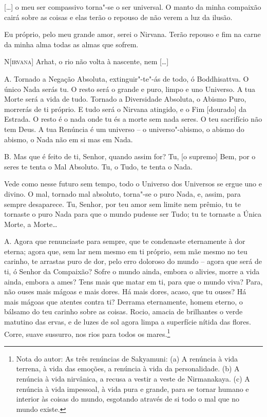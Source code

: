 [\ldots{}] o meu ser compassivo torna"-se o ser universal. O manto da minha
compaixão cairá sobre as coisas e elas terão o repouso de não verem a
luz da ilusão.

Eu próprio, pelo meu grande amor, serei o Nirvana. Terão repouso e fim
na carne da minha alma todas as almas que sofrem.

\textsc{N[irvana]} Arhat, o rio não volta à nascente, nem [\ldots{}]

\textsc{A.} Tornado a Negação Absoluta, extinguir"-te"-ás de todo, ó
Boddhisattva. O único Nada serás tu. O resto será o grande e puro,
limpo e uno Universo. A tua Morte será a vida de tudo. Tornado a
Diversidade Absoluta, o Abismo Puro, morrerás de ti próprio. E tudo
será o Nirvana atingido, e o Fim [dourado] da Estrada. O resto é o
nada onde tu és a morte sem nada seres. O teu sacrifício não tem
Deus. A tua Renúncia é um universo -- o universo"-abismo, o abismo do
abismo, o Nada não em si mas em Nada.

\textsc{B.} Mas que é feito de ti, Senhor, quando assim for? Tu, [o supremo]
Bem, por o seres te tenta o Mal Absoluto. Tu, o Tudo, te tenta o
Nada.

Vede como nesse futuro sem tempo, todo o Universo dos Universos se
ergue uno e divino. O mal, tornado mal absoluto, torna"-se o puro
Nada, e, assim, para sempre desaparece. Tu, Senhor, por teu amor sem
limite nem prêmio, tu te tornaste o puro Nada para que o mundo
pudesse ser Tudo; tu te tornaste a Única Morte, a Morte\ldots{}

\textsc{A.} Agora que renunciaste para sempre, que te condenaste eternamente à
dor eterna; agora que, sem lar nem mesmo em ti próprio, sem mãe mesmo
no teu carinho, te arrastas puro de dor, pelo erro doloroso do mundo
-- agora que será de ti, ó Senhor da Compaixão? Sofre o mundo ainda,
embora o alivies, morre a vida ainda, embora a ames? Tens mais que
matar em ti, para que o mundo viva? Para, não ouses mais mágoas e
mais dores. Há mais dores, acaso, que tu ouses? Há mais mágoas que
atentes contra ti? Derrama eternamente, homem eterno, o bálsamo do
teu carinho sobre as coisas. Rocio, amacia de brilhantes o verde
matutino das ervas, e de luzes de sol agora limpa a superfície nítida
das flores. Corre, suave sussurro, nos rios para todos os
mares.\footnote{ Nota do autor: As três renúncias de
Sakyamuni: (a)
A renúncia à vida terrena, à vida das emoções, a renúncia à vida
da personalidade.
(b) A renúncia à vida nirvânica, a recusa a vestir a veste de
Nirmanakaya.
(c) A renúncia à vida impessoal, à vida pura e grande, para se
tornar humano e interior às coisas do mundo, esgotando através de si
todo o mal que no mundo existe.}

